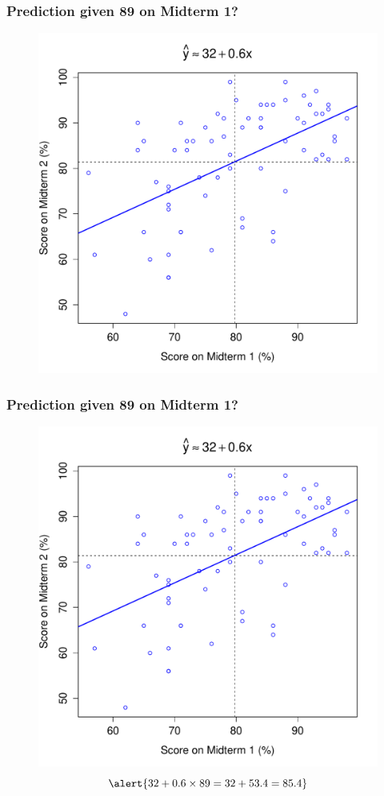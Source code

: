 \documentclass[handout]{beamer}
\begin{document}
\begin{frame}
\frametitle{Prediction given 89 on Midterm 1? }
\begin{figure}
	\includegraphics[scale = 0.48]{./images/midterms5}
\end{figure}
\end{frame}
\begin{frame}
\frametitle{Prediction given 89 on Midterm 1? }
\begin{figure}
	\includegraphics[scale = 0.38]{./images/midterms5}
	$$\alert{32 + 0.6 \times 89 = 32 + 53.4 = 85.4}$$
\end{figure}
\end{frame}
\end{document}
